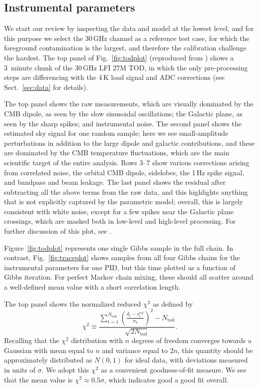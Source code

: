 \documentclass[onecolumn]{aa}
\begin{document}
\subsection{Instrumental parameters}
\label{sec:tod_params}

We start our review by inspecting the data and model at the lowest
level, and for this purpose we select the 30\,GHz channel as a
reference test case, for which the foreground contamination is the
largest, and therefore the calibration challenge the hardest. The top
panel of Fig.~\ref{fig:todplot} (reproduced from \citealp{bp10}) shows
a 3~minute chunk of the 30\,GHz LFI 27M TOD, in which the only
pre-processing steps are differencing with the 4\,K load signal and
ADC corrections (see Sect.~\ref{sec:data} for details).

The top panel shows the raw measurements, which are visually dominated
by the CMB dipole, as seen by the slow sinusoidal oscillations; the
Galactic plane, as seen by the sharp spikes; and instrumental
noise. The second panel shows the estimated sky signal for one random
sample; here we see small-amplitude perturbations in addition to the
large dipole and galactic contributions, and these are dominated by
the CMB temperature fluctuations, which are the main scientific target
of the entire analysis. Rows 3--7 show various corrections arising
from correlated noise, the orbital CMB dipole, sidelobes, the 1\,Hz
spike signal, and bandpass and beam leakage. The last panel shows the
residual after subtracting all the above terms from the raw data,
and this highlights anything that is not explicitly captured by the
parametric model; overall, this is largely consistent with white
noise, except for a few spikes near the Galactic plane crossings,
which are masked both in low-level and high-level processing. For
further discussion of this plot, see \citet{bp10}.


Figure~\ref{fig:todplot} represents one single Gibbs sample in the
full chain. In contrast, Fig.~\ref{fig:traceplot} shows samples from
all four Gibbs chains for the instrumental parameters for one PID, but
this time plotted as a function of Gibbs iteration. For perfect Markov
chain mixing, these should all scatter around a well-defined mean
value with a short correlation length.

The top panel shows the normalized reduced $\chi^2$ as defined by
\begin{equation}
\chi^2 \equiv \frac{\sum_{t=1}^{N_{\mathrm{tod}}} \left(\frac{d_t - s_t^{\mathrm{tot}}}{\sigma_0}
  \right)^2 - N_{\mathrm{tod}}}{\sqrt{2N_{\mathrm{tod}}}}.
\label{eq:redchisq}
\end{equation}
Recalling that the $\chi^2$ distribution with $n$ degrees of freedom
converges towards a Gaussian with mean equal to $n$ and variance equal
to $2n$, this quantity should be approximately distributed as $N(0,1)$
for ideal data, with deviations measured in units of $\sigma$. We
adopt this $\chi^2$ as a convenient goodness-of-fit measure. We see
that the mean value is $\chi^2 \approx 0.5\sigma$, which indicates
good a good fit overall. 
\end{document}
